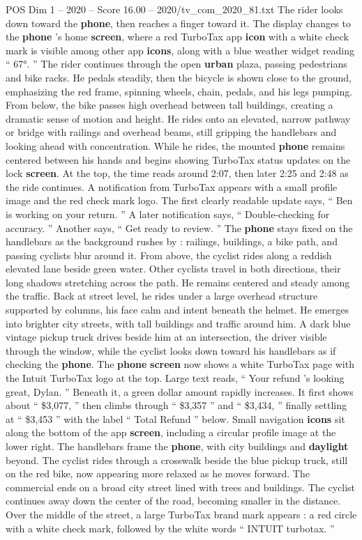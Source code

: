 \begin{textsample}{POS Dim 1 – 2020 – Score 16.00 – 2020/tv\_com\_2020\_81.txt}
The rider looks down toward the \textbf{phone}, then reaches a finger toward it.
The display changes to the \textbf{phone} ’s home \textbf{screen}, where a red TurboTax app \textbf{icon} with a white check mark is visible among other app \textbf{icons}, along with a blue weather widget reading “ 67{\EmojiFont °}. ” The rider continues through the open \textbf{urban} plaza, passing pedestrians and bike racks.
He pedals steadily, then the bicycle is shown close to the ground, emphasizing the red frame, spinning wheels, chain, pedals, and his legs pumping.
From below, the bike passes high overhead between tall buildings, creating a dramatic sense of motion and height.
He rides onto an elevated, narrow pathway or bridge with railings and overhead beams, still gripping the handlebars and looking ahead with concentration.
While he rides, the mounted \textbf{phone} remains centered between his hands and begins showing TurboTax status updates on the lock \textbf{screen}.
At the top, the time reads around 2:07, then later 2:25 and 2:48 as the ride continues.
A notification from TurboTax appears with a small profile image and the red check mark logo.
The first clearly readable update says, “ Ben is working on your return. ” A later notification says, “ Double-checking for accuracy. ” Another says, “ Get ready to review. ” The \textbf{phone} stays fixed on the handlebars as the background rushes by : railings, buildings, a bike path, and passing cyclists blur around it.
From above, the cyclist rides along a reddish elevated lane beside green water.
Other cyclists travel in both directions, their long shadows stretching across the path.
He remains centered and steady among the traffic.
Back at street level, he rides under a large overhead structure supported by columns, his face calm and intent beneath the helmet.
He emerges into brighter city streets, with tall buildings and traffic around him.
A dark blue vintage pickup truck drives beside him at an intersection, the driver visible through the window, while the cyclist looks down toward his handlebars as if checking the \textbf{phone}.
The \textbf{phone} \textbf{screen} now shows a white TurboTax page with the Intuit TurboTax logo at the top.
Large text reads, “ Your refund ’s looking great, Dylan. ” Beneath it, a green dollar amount rapidly increases.
It first shows about “ \$3,077, ” then climbs through “ \$3,357 ” and “ \$3,434, ” finally settling at “ \$3,453 ” with the label “ Total Refund ” below.
Small navigation \textbf{icons} sit along the bottom of the app \textbf{screen}, including a circular profile image at the lower right.
The handlebars frame the \textbf{phone}, with city buildings and \textbf{daylight} beyond.
The cyclist rides through a crosswalk beside the blue pickup truck, still on the red bike, now appearing more relaxed as he moves forward.
The commercial ends on a broad city street lined with trees and buildings.
The cyclist continues away down the center of the road, becoming smaller in the distance.
Over the middle of the street, a large TurboTax brand mark appears : a red circle with a white check mark, followed by the white words “ INTUIT turbotax. ”


\end{textsample}

